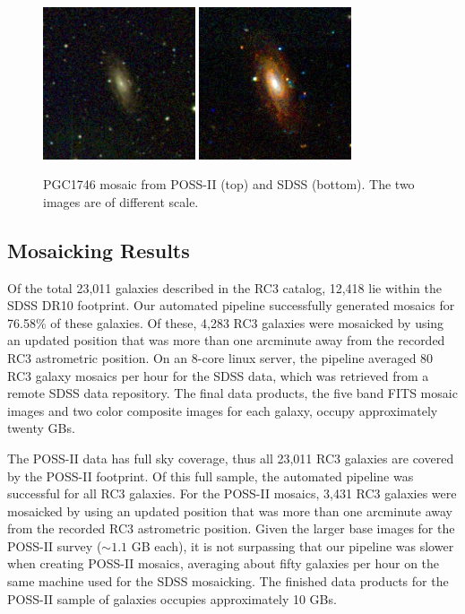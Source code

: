 \documentclass[authoryear, 12pt, 5p, times]{elsarticle}
\begin{document}
\begin{figure}[h]
\centering
\includegraphics[width=0.4\textwidth]{figures/DSS_1154_BEST}	
\includegraphics[width=0.4\textwidth]{figures/SDSS_1154_BEST}
\caption{PGC1746 mosaic from POSS-II (top) and SDSS (bottom). The two images are of different scale.}
\label{sdss_dss_comp}
\end{figure}

\subsection{Mosaicking Results}

Of the total 23,011 galaxies described in the RC3 catalog, 12,418 lie within the SDSS DR10 footprint. Our automated pipeline successfully generated mosaics for 76.58\% of these galaxies. Of these, 4,283 RC3 galaxies were mosaicked by using an updated position that was more than one arcminute away from the recorded RC3 astrometric position. On an 8-core linux server, the pipeline averaged 80 RC3 galaxy mosaics per hour for the SDSS data, which was retrieved from a remote SDSS data repository. The final data products, the five band FITS mosaic images and two color composite images for each galaxy, occupy approximately twenty GBs.

The POSS-II data has full sky coverage, thus all 23,011 RC3 galaxies are covered by the POSS-II footprint. Of this full sample, the automated pipeline was successful for all RC3 galaxies. For the POSS-II mosaics, 3,431 RC3 galaxies were mosaicked by using an updated position that was more than one arcminute away from the recorded RC3 astrometric position. Given the larger base images for the POSS-II survey ($\sim1.1$ GB each), it is not surpassing that our pipeline was slower when creating POSS-II mosaics, averaging about fifty galaxies per hour on the same machine used for the SDSS mosaicking. The finished data products for the POSS-II sample of galaxies occupies approximately 10 GBs.
\end{document}
